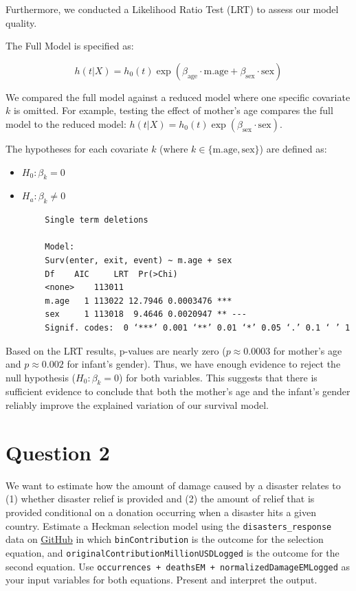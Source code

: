 \documentclass[12pt,letterpaper]{article}
\begin{document}
	Furthermore, we conducted a Likelihood Ratio Test (LRT) to assess our model quality. 
	
	The Full Model is specified as:
	
	$$h(t|X) = h_0(t) \exp(\beta_{\text{age}} \cdot \text{m.age} + \beta_{\text{sex}} \cdot \text{sex})$$
	
	We compared the full model against a reduced model where one specific covariate $k$ is omitted. For example, testing the effect of mother's age compares the full model to the reduced model: $h(t|X) = h_0(t) \exp(\beta_{\text{sex}} \cdot \text{sex})$. 
	
	The hypotheses for each covariate $k$ (where $k \in \{\text{m.age}, \text{sex}\}$) are defined as:
	
	\begin{itemize}
		\item $H_0: \beta_k = 0$
		\item $H_a: \beta_k \neq 0$
	\end{itemize}
	
	
	
	\begin{verbatim}
		Single term deletions
		
		Model:
		Surv(enter, exit, event) ~ m.age + sex
		Df    AIC     LRT  Pr(>Chi)    
		<none>    113011                      
		m.age   1 113022 12.7946 0.0003476 ***
		sex     1 113018  9.4646 0.0020947 ** ---
		Signif. codes:  0 ‘***’ 0.001 ‘**’ 0.01 ‘*’ 0.05 ‘.’ 0.1 ‘ ’ 1 
	\end{verbatim}
	
	Based on the LRT results, p-values are nearly zero ($p \approx 0.0003$ for mother's age and $p \approx 0.002$ for infant's gender). Thus, we have enough evidence to reject the null hypothesis ($H_0: \beta_k = 0$) for both variables. This suggests that there is sufficient evidence to conclude that both the mother's age and the infant's gender reliably improve the explained variation of our survival model.
	
	\vspace{1.5cm}
	
	\section*{Question 2}
	
	We want to estimate how the amount of damage caused by a disaster relates to (1) whether disaster relief is provided and (2) the amount of relief that is provided conditional on a donation occurring when a disaster hits a given country. Estimate a Heckman selection model using the \texttt{disasters\_response} data on \href{https://raw.githubusercontent.com/ASDS-TCD/StatsII_2026/refs/heads/main/datasets/disaster_response.csv}{GitHub} in which \texttt{binContribution} is the outcome for the selection equation, and \texttt{originalContributionMillionUSDLogged} is the outcome for the second equation. Use \texttt{occurrences + deathsEM + normalizedDamageEMLogged} as your input variables for both equations. Present and interpret the output.
	
\end{document}
